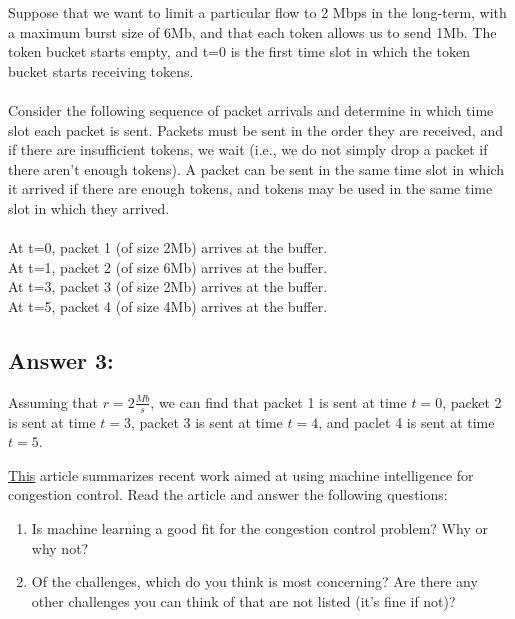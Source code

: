 \documentclass[10pt]{article}
\newenvironment{problem}[2][Problem]{\begin{trivlist}
\item[\hskip \labelsep {\bfseries #1}\hskip \labelsep {\bfseries #2.}]}{\end{trivlist}}
\begin{document}
\begin{problem}{3: Token Buckets}
Suppose that we want to limit a particular flow to 2 Mbps in the long-term, with a maximum burst size of 6Mb, and that each token allows us to send 1Mb. The token bucket starts empty, and t=0 is the first time slot in which the token bucket starts receiving tokens. \\\\
Consider the following sequence of packet arrivals and determine in which time slot each packet is sent. Packets must be sent in the order they are received, and if there are insufficient tokens, we wait (i.e., we do not simply drop a packet if there aren't enough tokens). A packet can be sent in the same time slot in which it arrived if there are enough tokens, and tokens may be used in the same time slot in which they arrived. \\\\
At t=0, packet 1 (of size 2Mb) arrives at the buffer. \\
At t=1, packet 2 (of size 6Mb) arrives at the buffer. \\
At t=3, packet 3 (of size 2Mb) arrives at the buffer. \\
At t=5, packet 4 (of size 4Mb) arrives at the buffer. \\

\end{problem}
\subsection*{Answer 3:}
Assuming that $r = 2 \frac{Mb}{s}$, we can find that packet 1 is sent at time $t = 0$, packet 2 is sent at time $t = 3$, packet 3 is sent at time $t = 4$, and paclet 4 is sent at time $t = 5$.
\begin{problem}{4: Reading}
\href{https://par.nsf.gov/servlets/purl/10179370}{This} article summarizes recent work aimed at using machine intelligence for congestion control. Read the article and answer the following questions:

\begin{enumerate}
    \item Is machine learning a good fit for the congestion control problem? Why or why not?
    \item Of the challenges, which do you think is most concerning? Are there any other challenges you can think of that are not listed (it's fine if not)?
\end{enumerate}
\end{problem}
\end{document}
